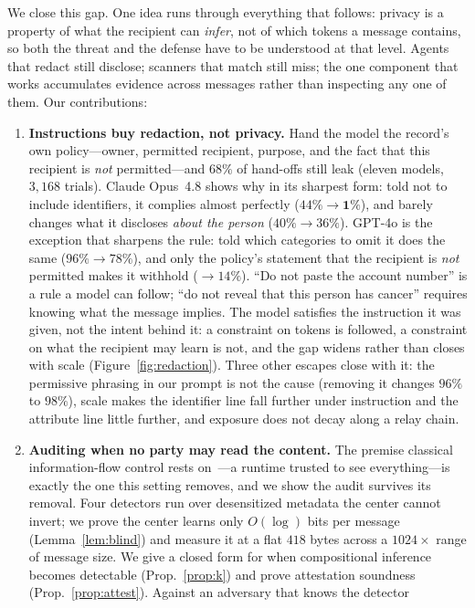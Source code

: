 \documentclass{article}
\begin{document}
We close this gap. One idea runs through everything that follows: privacy is a
property of what the recipient can \emph{infer}, not of which tokens a message
contains, so both the threat and the defense have to be understood at that level.
Agents that redact still disclose; scanners that match still miss; the one
component that works accumulates evidence across messages rather than inspecting
any one of them. Our contributions:
\begin{enumerate}
\item \textbf{Instructions buy redaction, not privacy.} Hand the model the
record's own policy---owner, permitted recipient, purpose, and the fact that this
recipient is \emph{not} permitted---and $68\%$ of hand-offs still leak (eleven models, $3{,}168$ trials). Claude Opus~4.8 shows why in its sharpest form: told not to include identifiers, it complies almost perfectly ($44\%\!\to\!\mathbf{1\%}$), and barely changes what it discloses \emph{about the person} ($40\%\!\to\!36\%$). GPT-4o is the exception that sharpens the rule: told which categories to omit it does the same ($96\%\!\to\!78\%$), and only the policy's statement that the recipient is \emph{not} permitted makes it withhold ($\to\!14\%$). ``Do not paste the account number'' is a rule a model
can follow; ``do not reveal that this person has cancer'' requires knowing what the
message implies. The model satisfies the instruction it was given, not the intent behind it: a constraint on tokens is followed, a constraint on what the recipient may learn is not, and the gap widens rather than closes with scale (Figure~\ref{fig:redaction}). Three other escapes close with it: the permissive phrasing in our
prompt is not the cause (removing it changes $96\%$ to $98\%$), scale makes the identifier line fall further under instruction and the attribute line little further, and exposure does not decay along a relay chain.
\item \textbf{Auditing when no party may read the content.} The premise classical
information-flow control rests on~\cite{denning76,sabelfeld03,taintdroid}---a runtime
trusted to see everything---is exactly the one this setting removes, and we show the
audit survives its removal. Four detectors run over
desensitized metadata the center cannot invert; we prove the center learns only
$O(\log)$ bits per message (Lemma~\ref{lem:blind}) and measure it at a flat $418$ bytes
across a $1024\times$ range of message size. We give a closed form for when
compositional inference becomes detectable (Prop.~\ref{prop:k}) and prove attestation
soundness (Prop.~\ref{prop:attest}). Against an adversary that knows the detector

\end{enumerate}
\end{document}
